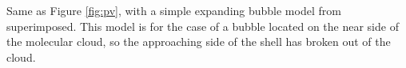\label{fig:pv_model} Same as Figure \ref{fig:pv}, with a simple expanding bubble model from \citet{Arce11} superimposed. This model is for the case of a bubble located on the near side of the molecular cloud, so the approaching side of the shell has broken out of the cloud.